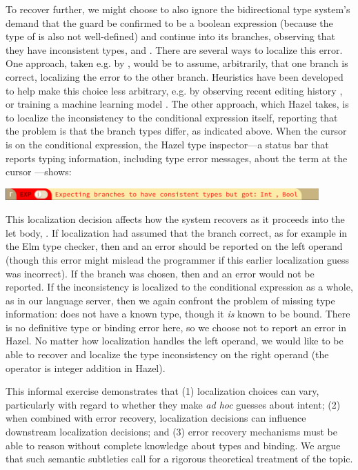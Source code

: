 To recover further, we might choose to also ignore the bidirectional type system's demand that the guard be confirmed to be a boolean expression 
(because the type of  is also not well-defined) 
and continue into its branches, observing that they have inconsistent types,  and . 
There are several ways to localize this error. 
One approach, taken e.g. by , would be to assume, arbitrarily, that one branch is correct, localizing the error to the other branch. 
Heuristics have been developed to help make this choice less arbitrary, e.g. 
by observing recent editing history \cite{steady-typing}, 
or training a machine learning model \cite{SeidelBlame}. 
The other approach, which Hazel takes, is to localize the inconsistency to the conditional expression itself, reporting that the problem is that the branch types differ, as indicated above. When the cursor is on the conditional expression, the Hazel type inspector---a status bar that reports typing information, including type error messages, about the term at the cursor \cite{potter2020hazel}---shows:

\begin{center}
  \includegraphics[width=0.9\textwidth]{images/haz3l-inconsistent-branches-cursor-inspector.png}
\end{center}

This localization decision affects how the system recovers as it proceeds into the let body, . 
If localization had assumed that the  branch correct, as for example in the Elm type checker, then  and an error should be reported on the left operand (though this error might mislead the programmer if this earlier localization guess was incorrect).
If the  branch was chosen, then  and an error would not be reported. 
If the inconsistency is localized to the conditional expression as a whole, as in our language server, then we again confront the problem of missing type information: 
 does not have a known type,
though it \emph{is} known to be bound. 
There is no definitive type or binding error here, 
so we choose not to report an error in Hazel.
No matter how localization handles the left operand, we would like to be able to recover and 
localize the type inconsistency on the right operand (the \li{+} operator is integer addition in Hazel).

This informal exercise demonstrates that (1) localization choices can vary, particularly with regard to whether they make \emph{ad hoc} guesses about intent;  
(2) when combined with error recovery, localization decisions can influence downstream localization decisions; and 
(3) error recovery mechanisms must be able to reason without complete knowledge about types and binding. We argue that such semantic subtleties call for a rigorous theoretical treatment of the topic.

